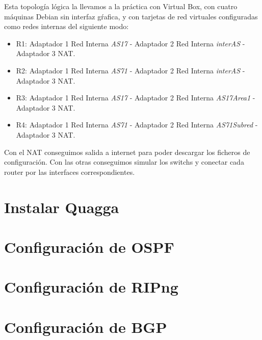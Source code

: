 \documentclass{article}
\begin{document}
\hfill

Esta topología lógica la llevamos a la práctica con Virtual Box, con cuatro máquinas Debian sin interfaz gŕafica, y con tarjetas de red virtuales configuradas como redes internas del siguiente modo:

\begin{itemize}

	\item R1: Adaptador 1 Red Interna \textit{AS17} - Adaptador 2 Red Interna \textit{interAS} - Adaptador 3 NAT.
	
	\item R2: Adaptador 1 Red Interna \textit{AS71} - Adaptador 2 Red Interna \textit{interAS} - Adaptador 3 NAT.
	
	\item R3: Adaptador 1 Red Interna \textit{AS17} - Adaptador 2 Red Interna \textit{AS17Area1} - Adaptador 3 NAT.
	
	\item R4: Adaptador 1 Red Interna \textit{AS71} - Adaptador 2 Red Interna \textit{AS71Subred} - Adaptador 3 NAT.

\end{itemize}

Con el NAT conseguimos salida a internet para poder descargar los ficheros de configuración. Con las otras conseguimos simular los switchs y conectar cada router por las interfaces correspondientes.


\section{Instalar Quagga}

\section{Configuración de OSPF}


\section{Configuración de RIPng}

\section{Configuración de BGP}

%
\end{document}
